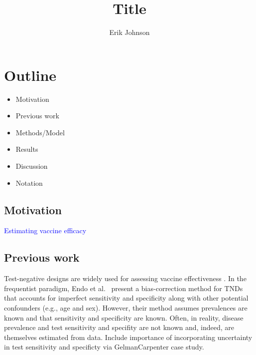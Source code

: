 \documentclass[11pt,notitlepage,twoside]{article}
\newcommand{\ej}[1]{\textcolor{blue}{#1}}
\begin{document}


\title{Title}
\author{Erik Johnson}


\maketitle


%
\tableofcontents

\section{Outline}
\begin{itemize}
\item Motivation
\item Previous work
\item Methods/Model
\item Results
\item Discussion
\item Notation
\end{itemize}


\subsection{Motivation}
\ej{Estimating vaccine efficacy}

\subsection{Previous work}
Test-negative designs are widely used for assessing vaccine effectiveness \cite{fukushima2017basic,lipsitch2020understanding}. In the frequentist paradigm, Endo et al.~\cite{endo2020bias} present a bias-correction method for TNDs that accounts for imperfect sensitivity and specificity along with other potential confounders (e.g., age and sex). However, their method assumes prevalences are known and that sensitivity and specificity are known. Often, in reality, disease prevalence and test sensitivity and specifity are not known and, indeed, are themselves estimated from data. Include importance of incorporating uncertainty in test sensitivity and specificty via GelmanCarpenter case study. 
\end{document}

